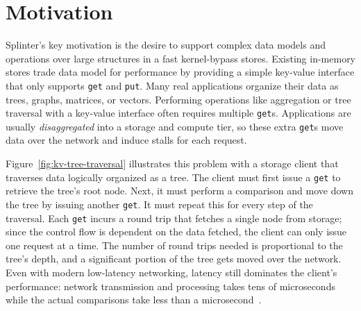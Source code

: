 \section{Motivation}
\label{sec:motivation}



Splinter's key motivation is the desire to support complex 
    data models and operations over large structures in a fast kernel-bypass
    stores.
Existing in-memory stores trade data model for performance by
  providing a simple key-value interface that only supports \texttt{get} and
  \texttt{put}.
Many real applications organize their data as trees, graphs, matrices, or vectors.
Performing operations like aggregation or tree traversal with a
  key-value interface often requires multiple \texttt{get}s.
Applications are usually \textsl{disaggregated} into a storage and
  compute tier, so these extra \texttt{get}s move data over the network
  and induce stalls for each request.

Figure~\ref{fig:kv-tree-traversal} illustrates this problem with a
storage client that traverses data logically organized as a tree.
The client must first issue
a \texttt{get} to retrieve the tree's root node.
Next, it must perform a comparison and move down the tree by
issuing another \texttt{get}. It must repeat this
for every step of the traversal. Each \texttt{get} incurs a
round trip that fetches a single node from storage; since
the control flow is dependent on the data fetched, the client can only issue
one request at a time. The
number of round trips needed is proportional to the tree's depth, and a
significant portion of the tree gets moved over the network. Even with
modern low-latency networking, latency still dominates the client's performance:
network transmission and processing takes tens of
microseconds while the actual comparisons take less than a
microsecond~\cite{ramcloud}.

